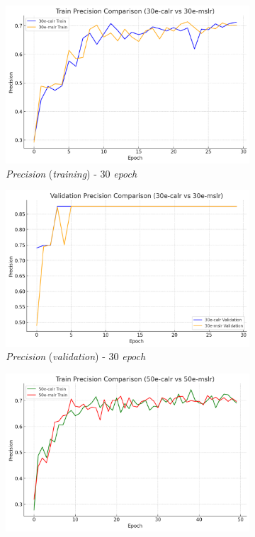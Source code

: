 \begin{figure}[htbp]
  \centering
  \begin{subfigure}{0.45\textwidth}
    \includegraphics[width=\textwidth]{gambar/bab4-train-precision-30e.png}
    \caption{\emph{Precision} (\emph{training}) - 30 \emph{epoch}}
  \end{subfigure}
  \hfill
  \begin{subfigure}{0.45\textwidth}
    \includegraphics[width=\textwidth]{gambar/bab4-val-precision-30e.png}
    \caption{\emph{Precision} (\emph{validation}) - 30 \emph{epoch}}
  \end{subfigure}
  \hfill
  \begin{subfigure}{0.45\textwidth}
    \includegraphics[width=\textwidth]{gambar/bab4-train-precision-50e.png}

\end{subfigure}
\end{figure}
